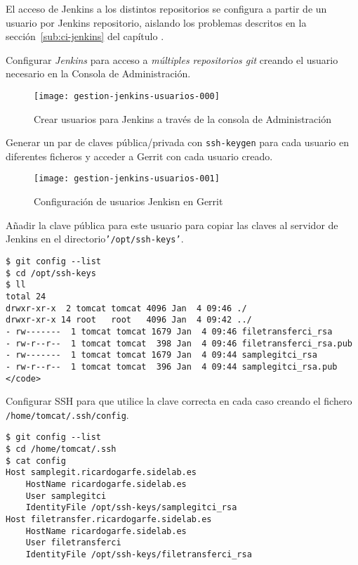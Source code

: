\par El acceso de Jenkins a los distintos repositorios se configura a partir de un usuario por Jenkins repositorio, aislando los problemas descritos en la sección~\ref{sub:ci-jenkins} del capítulo .

\par Configurar \emph{Jenkins} para acceso a \emph{múltiples repositorios git} creando el usuario necesario en la Consola de Administración.

\begin{figure}[H]
    \centering
    \texttt{[image: gestion-jenkins-usuarios-000]}
    \caption{Crear usuarios para Jenkins a través de la consola de Administración}
    \label{fig:gestion-jenkins-usuarios-000}
\end{figure}

\par Generar un par de claves pública/privada con \texttt{ssh-keygen} para cada usuario en diferentes ficheros y acceder a Gerrit con cada usuario creado.

\begin{figure}[H]
    \centering
    \texttt{[image: gestion-jenkins-usuarios-001]}
    \caption{Configuración de usuarios Jenkisn en Gerrit}
    \label{fig:gestion-jenkins-usuarios-001}
\end{figure}

\par Añadir la clave pública para este usuario para copiar las claves al servidor de Jenkins en el directorio\texttt{'/opt/ssh-keys'}.

\lstset{style=bashbasico}
\begin{lstlisting}[frame=trbl]
$ git config --list
$ cd /opt/ssh-keys
$ ll
total 24
drwxr-xr-x  2 tomcat tomcat 4096 Jan  4 09:46 ./
drwxr-xr-x 14 root   root   4096 Jan  4 09:42 ../
- rw-------  1 tomcat tomcat 1679 Jan  4 09:46 filetransferci_rsa
- rw-r--r--  1 tomcat tomcat  398 Jan  4 09:46 filetransferci_rsa.pub
- rw-------  1 tomcat tomcat 1679 Jan  4 09:44 samplegitci_rsa
- rw-r--r--  1 tomcat tomcat  396 Jan  4 09:44 samplegitci_rsa.pub
</code>
\end{lstlisting}

\par Configurar SSH para que utilice la clave correcta en cada caso creando el fichero \texttt{/home/tomcat/.ssh/config}.

\lstset{style=bashbasico}
\begin{lstlisting}[frame=trbl]
$ git config --list
$ cd /home/tomcat/.ssh
$ cat config
Host samplegit.ricardogarfe.sidelab.es
    HostName ricardogarfe.sidelab.es
    User samplegitci
    IdentityFile /opt/ssh-keys/samplegitci_rsa
Host filetransfer.ricardogarfe.sidelab.es
    HostName ricardogarfe.sidelab.es
    User filetransferci
    IdentityFile /opt/ssh-keys/filetransferci_rsa
\end{lstlisting}

